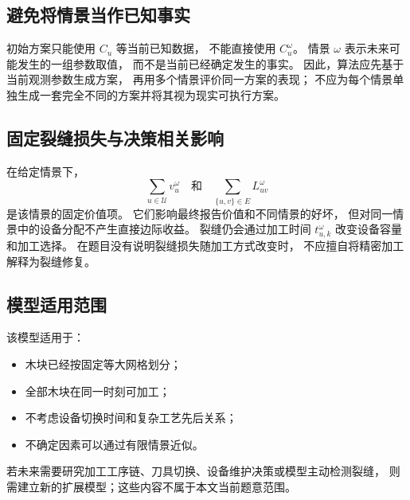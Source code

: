 ﻿\documentclass[UTF8,12pt,a4paper]{ctexart}
\begin{document}
\subsection{避免将情景当作已知事实}

\begin{description}[leftmargin=2em,labelsep=0.5em,itemsep=0.6em]
  \item[\textbf{信息边界：}]
初始方案只能使用 \(C_u\) 等当前已知数据，
不能直接使用 \(C_u^\omega\)。
情景 \( \omega \) 表示未来可能发生的一组参数取值，
而不是当前已经确定发生的事实。
因此，算法应先基于当前观测参数生成方案，
再用多个情景评价同一方案的表现；
不应为每个情景单独生成一套完全不同的方案并将其视为现实可执行方案。
\end{description}

\subsection{固定裂缝损失与决策相关影响}

\begin{description}[leftmargin=2em,labelsep=0.5em,itemsep=0.6em]
  \item[\textbf{固定价值项：}]
在给定情景下，
\[
\sum_{u\in\mathcal U}v_u^\omega
\quad\text{和}\quad
\sum_{\{u,v\}\in E}L_{uv}^{\omega}
\]
是该情景的固定价值项。
它们影响最终报告价值和不同情景的好坏，
但对同一情景中的设备分配不产生直接边际收益。
裂缝仍会通过加工时间 \(t_{u,k}^\omega\)
改变设备容量和加工选择。
在题目没有说明裂缝损失随加工方式改变时，
不应擅自将精密加工解释为裂缝修复。
\end{description}

\subsection{模型适用范围}

\begin{description}[leftmargin=2em,labelsep=0.5em,itemsep=0.6em]
  \item[\textbf{适用条件：}]
该模型适用于：

\begin{itemize}
  \item 木块已经按固定等大网格划分；
  \item 全部木块在同一时刻可加工；
  \item 不考虑设备切换时间和复杂工艺先后关系；
  \item 不确定因素可以通过有限情景近似。
\end{itemize}

若未来需要研究加工工序链、刀具切换、设备维护决策或模型主动检测裂缝，
则需建立新的扩展模型；这些内容不属于本文当前题意范围。
\end{description}
\end{document}
